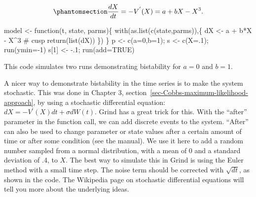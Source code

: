 \documentclass[
  a4paper,
  DIV=11,
  numbers=noendperiod,
  oneside]{scrreprt}
\newenvironment{Shaded}{}{}
\newcommand{\AttributeTok}[1]{\textcolor[rgb]{0.84,0.23,0.29}{#1}}
\newcommand{\CommentTok}[1]{\textcolor[rgb]{0.42,0.45,0.49}{#1}}
\newcommand{\ConstantTok}[1]{\textcolor[rgb]{0.00,0.36,0.77}{#1}}
\newcommand{\ControlFlowTok}[1]{\textcolor[rgb]{0.84,0.23,0.29}{#1}}
\newcommand{\DecValTok}[1]{\textcolor[rgb]{0.00,0.36,0.77}{#1}}
\newcommand{\FunctionTok}[1]{\textcolor[rgb]{0.44,0.26,0.76}{#1}}
\newcommand{\NormalTok}[1]{\textcolor[rgb]{0.14,0.16,0.18}{#1}}
\newcommand{\OtherTok}[1]{\textcolor[rgb]{0.44,0.26,0.76}{#1}}
\newcommand{\SpecialCharTok}[1]{\textcolor[rgb]{0.00,0.36,0.77}{#1}}
\begin{document}
\begin{equation}\phantomsection\label{eq-ch4n-5-old-25}{
\frac{dX}{dt} = - V^{'}(X) = {a + bX - X}^{3}.
}\end{equation}

\begin{Shaded}
\begin{Highlighting}[]
\NormalTok{model }\OtherTok{\textless{}{-}} \ControlFlowTok{function}\NormalTok{(t, state, parms)\{}
  \FunctionTok{with}\NormalTok{(}\FunctionTok{as.list}\NormalTok{(}\FunctionTok{c}\NormalTok{(state,parms)),\{}
\NormalTok{    dX }\OtherTok{\textless{}{-}}\NormalTok{  a }\SpecialCharTok{+}\NormalTok{ b}\SpecialCharTok{*}\NormalTok{X }\SpecialCharTok{{-}}\NormalTok{ X}\SpecialCharTok{\^{}}\DecValTok{3}        \CommentTok{\# cusp}
    \FunctionTok{return}\NormalTok{(}\FunctionTok{list}\NormalTok{(dX))}
\NormalTok{  \})}
\NormalTok{\}}
\NormalTok{p }\OtherTok{\textless{}{-}} \FunctionTok{c}\NormalTok{(}\AttributeTok{a=}\DecValTok{0}\NormalTok{,}\AttributeTok{b=}\DecValTok{1}\NormalTok{); s }\OtherTok{\textless{}{-}} \FunctionTok{c}\NormalTok{(}\AttributeTok{X=}\NormalTok{.}\DecValTok{1}\NormalTok{); }\FunctionTok{run}\NormalTok{(}\AttributeTok{ymin=}\SpecialCharTok{{-}}\DecValTok{1}\NormalTok{)}
\NormalTok{s[}\DecValTok{1}\NormalTok{] }\OtherTok{\textless{}{-}} \SpecialCharTok{{-}}\NormalTok{.}\DecValTok{1}\NormalTok{; }\FunctionTok{run}\NormalTok{(}\AttributeTok{add=}\ConstantTok{TRUE}\NormalTok{)}
\end{Highlighting}
\end{Shaded}

This code simulates two runs demonstrating bistability for \(a = 0\) and
\(b = 1\).

A nicer way to demonstrate bistability in the time series is to make the
system stochastic. This was done in Chapter 3,
section~\ref{sec-Cobbs-maximum-likelihood-approach}, by using a
stochastic differential equation: \(dX = - V^{'}(X)dt + \sigma dW(t)\).
Grind has a great trick for this. With the ``after'' parameter in the
function call, we can add discrete events to the system. ``After'' can
also be used to change parameter or state values after a certain amount
of time or after some condition (see the manual). We use it here to add
a random number sampled from a normal distribution, with a mean of 0 and
a standard deviation of .4, to \(X\). The best way to simulate this in
Grind is using the Euler method with a small time step. The noise term
should be corrected with \(\sqrt{dt}\), as shown in the code. The
Wikipedia page on stochastic differential equations will tell you more
about the underlying ideas.
\end{document}

